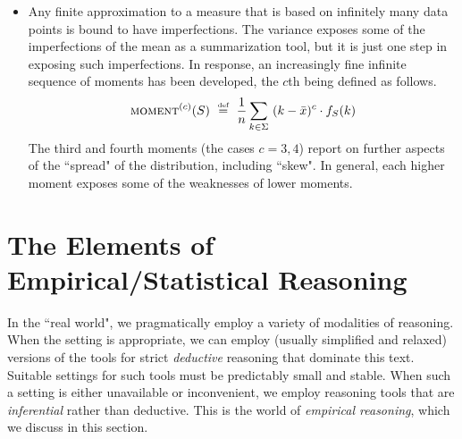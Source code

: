 \begin{itemize}
\item
Any finite approximation to a measure that is based on infinitely many data points is bound to have imperfections.  The variance exposes some of the imperfections of the mean as a summarization tool, but it is just one step in exposing such imperfections.  In response, an increasingly fine infinite sequence of moments has been developed, the $c$th being defined as follows.
\[
\mbox{\sc moment}^{(c)}(S) \ \stackrel{\mbox{{\tiny def}}}{=} \ {1 \over n} \sum_{k \in \Sigma} \ (k - \bar{x})^c \cdot f_S(k)
\]
The third and fourth moments (the cases $c = 3,4$) report on further aspects of the ``spread" of the distribution, including ``skew".  In general, each higher moment exposes some of the weaknesses of lower moments.
\end{itemize}


\section{The Elements of Empirical/Statistical Reasoning}
\label{sec:empirical}

In the ``real world", we pragmatically employ a variety of modalities of reasoning.  When the setting is appropriate, we can employ (usually simplified and relaxed) versions of the tools for strict {\em deductive} reasoning that dominate this text.  Suitable settings for such tools must be predictably small and stable.  When such a setting is either unavailable or inconvenient, we employ reasoning tools that are {\em inferential} rather than deductive.  This is the world of {\em empirical reasoning}, which we discuss in this section.

